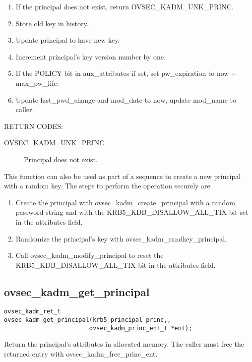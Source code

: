 \begin{enumerate}
\item If the principal does not exist, return OVSEC_KADM_UNK_PRINC.
\item Store old key in history.
\item Update principal to have new key.
\item Increment principal's key version number by one.
\item If the POLICY bit in aux_attributes if set, set pw_expiration to
now + max_pw_life.
\item Update last_pwd_change and mod_date to now, update mod_name to
caller.
\end{enumerate}

RETURN CODES:

\begin{description}
\item[OVSEC_KADM_UNK_PRINC] Principal does not exist.
\end{description}

This function can also be used as part of a sequence to create a new
principal with a random key.  The steps to perform the operation
securely are

\begin{enumerate}
\item Create the principal with ovsec_kadm_create_principal with a
random password string and with the KRB5_KDB_DISALLOW_ALL_TIX bit set
in the attributes field.

\item Randomize the principal's key with ovsec_kadm_randkey_principal.

\item Call ovsec_kadm_modify_principal to reset the
KRB5_KDB_DISALLOW_ALL_TIX bit in the attributes field.
\end{enumerate}

\subsection{ovsec_kadm_get_principal}

\begin{verbatim}
ovsec_kadm_ret_t
ovsec_kadm_get_principal(krb5_principal princ,,
                        ovsec_kadm_princ_ent_t *ent);  
\end{verbatim}

Return the principal's attributes in allocated memory.  The caller
must free the returned entry with ovsec_kadm_free_princ_ent.

